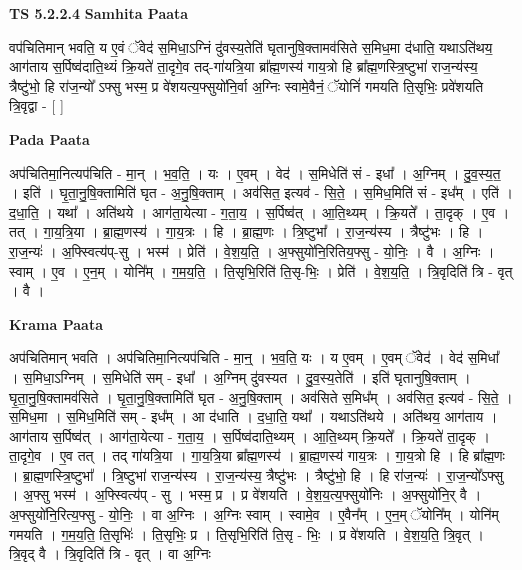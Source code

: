 \documentclass[17pt]{extarticle}
\begin{document}
\textbf{TS 5.2.2.4 } \newline
\textbf{Samhita Paata} \newline

वप॑चितिमान् भवति॒ य ए॒वं ॅवेद॑ स॒मिधा॒ऽग्निं दु॑वस्य॒तेति॑ घृतानुषि॒क्तामव॑सिते स॒मिध॒मा द॑धाति॒ यथाऽति॑थय॒ आग॑ताय स॒र्पिष्व॑दाति॒थ्यं क्रि॒यते॑ ता॒दृगे॒व तद्-गा॑यत्रि॒या ब्रा᳚ह्म॒णस्य॑ गाय॒त्रो हि ब्रा᳚ह्म॒णस्त्रि॒ष्टुभा॑ राज॒न्य॑स्य॒ त्रैष्टु॑भो॒ हि रा॑ज॒न्यो᳚ ऽफ्सु भस्म॒ प्र वे॑शयत्य॒फ्सुयो॑नि॒र्वा अ॒ग्निः स्वामे॒वैनं॒ ॅयोनिं॑ गमयति ति॒सृभिः॒ प्रवे॑शयति त्रि॒वृद्वा - [  ] \newline

\textbf{Pada Paata} \newline

अप॑चितिमा॒नित्यप॑चिति - मा॒न् । भ॒व॒ति॒ । यः । ए॒वम् । वेद॑ । स॒मिधेति॑ सं - इधा᳚ । अ॒ग्निम् । दु॒व॒स्य॒त॒ । इति॑ । घृ॒ता॒नु॒षि॒क्तामिति॑ घृत - अ॒नु॒षि॒क्ताम् । अव॑सित॒ इत्यव॑ - सि॒ते॒ । स॒मिध॒मिति॑ सं - इध᳚म् । एति॑ । द॒धा॒ति॒ । यथा᳚ । अति॑थये । आग॑ता॒येत्या - ग॒ता॒य॒ । स॒र्पिष्व॑त् । आ॒ति॒थ्यम् । क्रि॒यते᳚ । ता॒दृक् । ए॒व । तत् । गा॒य॒त्रि॒या । ब्रा॒ह्म॒णस्य॑ । गा॒य॒त्रः । हि । ब्रा॒ह्म॒णः । त्रि॒ष्टुभा᳚ । रा॒ज॒न्य॑स्य । त्रैष्टु॑भः । हि । रा॒ज॒न्यः॑ । अ॒फ्स्वित्य॑प्-सु । भस्म॑ । प्रेति॑ । वे॒श॒य॒ति॒ । अ॒फ्सुयो॑नि॒रितिय॒फ्सु - यो॒निः॒ । वै । अ॒ग्निः । स्वाम् । ए॒व । ए॒न॒म् । योनि᳚म् । ग॒म॒य॒ति॒ । ति॒सृभि॒रिति॑ ति॒सृ-भिः॒ । प्रेति॑ । वे॒श॒य॒ति॒ । त्रि॒वृदिति॑ त्रि - वृत् । वै ।  \newline


\textbf{Krama Paata} \newline

अप॑चितिमान् भवति । अप॑चितिमा॒नित्यप॑चिति - मा॒न्॒ । भ॒व॒ति॒ यः । य ए॒वम् । ए॒वम् ॅवेद॑ । वेद॑ स॒मिधा᳚ । स॒मिधा॒ऽग्निम् । स॒मिधेति॑ सम् - इधा᳚ । अ॒ग्निम् दु॑वस्यत । दु॒व॒स्य॒तेति॑ । इति॑ घृतानुषि॒क्ताम् । घृ॒ता॒नु॒षि॒क्तामव॑सिते । घृ॒ता॒नु॒षि॒क्तामिति॑ घृत - अ॒नु॒षि॒क्ताम् । अव॑सिते स॒मिध᳚म् । अव॑सित॒ इत्यव॑ - सि॒ते॒ । स॒मिध॒मा । स॒मिध॒मिति॑ सम् - इध᳚म् । आ द॑धाति । द॒धा॒ति॒ यथा᳚ । यथाऽति॑थये । अति॑थय॒ आग॑ताय । आग॑ताय स॒र्पिष्व॑त् । आग॑ता॒येत्या - ग॒ता॒य॒ । स॒र्पिष्व॑दाति॒थ्यम् । आ॒ति॒थ्यम् क्रि॒यते᳚ । क्रि॒यते॑ ता॒दृक् । ता॒दृगे॒व । ए॒व तत् । तद् गा॑यत्रि॒या । गा॒य॒त्रि॒या ब्रा᳚ह्म॒णस्य॑ । ब्रा॒ह्म॒णस्य॑ गाय॒त्रः । गा॒य॒त्रो हि । हि ब्रा᳚ह्म॒णः । ब्रा॒ह्म॒णस्त्रि॒ष्टुभा᳚ । त्रि॒ष्टुभा॑ राज॒न्य॑स्य । रा॒ज॒न्य॑स्य॒ त्रैष्टु॑भः । त्रैष्टु॑भो॒ हि । हि रा॑ज॒न्यः॑ । रा॒ज॒न्यो᳚ऽफ्सु । अ॒फ्सु भस्म॑ । अ॒फ्स्वित्य॑प् - सु । भस्म॒ प्र । प्र वे॑शयति । वे॒श॒य॒त्य॒फ्सुयो॑निः । अ॒फ्सुयो॑नि॒र् वै । अ॒फ्सुयो॑नि॒रित्य॒फ्सु - यो॒निः॒ । वा अ॒ग्निः । अ॒ग्निः स्वाम् । स्वामे॒व । ए॒वैन᳚म् । ए॒न॒म् ॅयोनि᳚म् । योनि॑म् गमयति । ग॒म॒य॒ति॒ ति॒सृभिः॑ । ति॒सृभिः॒ प्र । ति॒सृभि॒रिति॑ ति॒सृ - भिः॒ । प्र वे॑शयति । वे॒श॒य॒ति॒ त्रि॒वृत् । त्रि॒वृद् वै । त्रि॒वृदिति॑ त्रि - वृत् । वा अ॒ग्निः \newline
\end{document}
